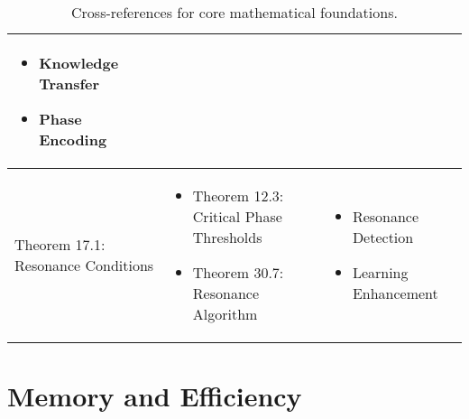 \begin{table}[h]
\begin{tabular}{|l|p{7cm}|p{4cm}|}
\begin{itemize}
    \item Knowledge Transfer
    \item Phase Encoding
\end{itemize} \\
\hline
Theorem 17.1: Resonance Conditions &
\begin{itemize}
    \item Theorem 12.3: Critical Phase Thresholds
    \item Theorem 30.7: Resonance Algorithm
\end{itemize} &
\begin{itemize}
    \item Resonance Detection
    \item Learning Enhancement
\end{itemize} \\
\hline
\end{tabular}
\caption{Cross-references for core mathematical foundations.}
\label{tab:xref_core}
\end{table}

\section{Memory and Efficiency}

